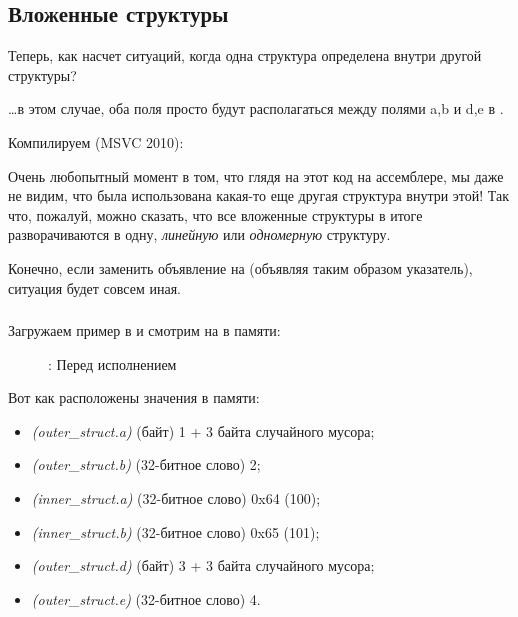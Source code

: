 \subsection{Вложенные структуры}

Теперь, как насчет ситуаций, когда одна структура определена внутри другой структуры?



\dots в этом случае, оба поля  просто будут располагаться между полями a,b и d,e в 
.

Компилируем (MSVC 2010):



Очень любопытный момент в том, что глядя на этот код на ассемблере, мы даже не видим, 
что была использована какая-то еще другая структура внутри этой!
Так что, пожалуй, можно сказать, что все вложенные структуры в итоге разворачиваются в одну, \emph{линейную} 
или \emph{одномерную} структуру.

Конечно, если заменить объявление  на  
(объявляя таким образом указатель), ситуация будет совсем иная.


\clearpage
\subsubsection{\olly}
\myindex{\olly}

Загружаем пример в \olly и смотрим на 
 в памяти:

\begin{figure}[H]
\centering
{}
\caption{\olly: Перед исполнением \printf}
\label{fig:nested_olly}
\end{figure}

Вот как расположены значения в памяти:
\begin{itemize}
\item \emph{(outer\_struct.a)} (байт) 1 + 3 байта случайного мусора;
\item \emph{(outer\_struct.b)} (32-битное слово) 2;
\item \emph{(inner\_struct.a)} (32-битное слово) 0x64 (100);
\item \emph{(inner\_struct.b)} (32-битное слово) 0x65 (101);
\item \emph{(outer\_struct.d)} (байт) 3 + 3 байта случайного мусора;
\item \emph{(outer\_struct.e)} (32-битное слово) 4.
\end{itemize}

